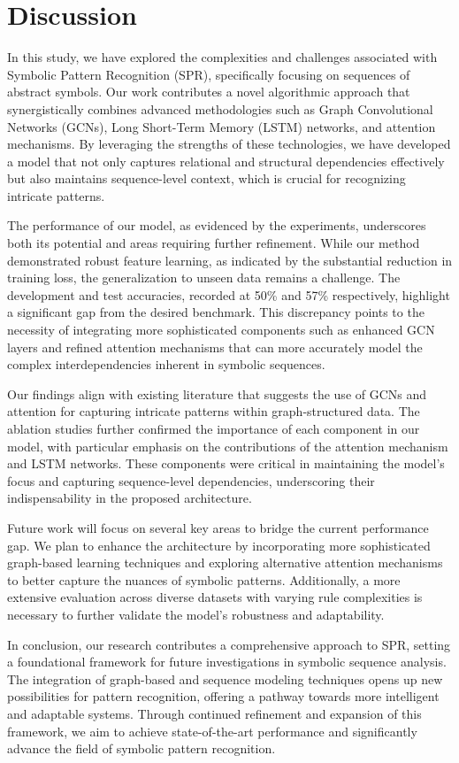 \documentclass{article}
\begin{document}
\section{Discussion}
In this study, we have explored the complexities and challenges associated with Symbolic Pattern Recognition (SPR), specifically focusing on sequences of abstract symbols. Our work contributes a novel algorithmic approach that synergistically combines advanced methodologies such as Graph Convolutional Networks (GCNs), Long Short-Term Memory (LSTM) networks, and attention mechanisms. By leveraging the strengths of these technologies, we have developed a model that not only captures relational and structural dependencies effectively but also maintains sequence-level context, which is crucial for recognizing intricate patterns.

The performance of our model, as evidenced by the experiments, underscores both its potential and areas requiring further refinement. While our method demonstrated robust feature learning, as indicated by the substantial reduction in training loss, the generalization to unseen data remains a challenge. The development and test accuracies, recorded at 50\% and 57\% respectively, highlight a significant gap from the desired benchmark. This discrepancy points to the necessity of integrating more sophisticated components such as enhanced GCN layers and refined attention mechanisms that can more accurately model the complex interdependencies inherent in symbolic sequences.

Our findings align with existing literature that suggests the use of GCNs and attention for capturing intricate patterns within graph-structured data. The ablation studies further confirmed the importance of each component in our model, with particular emphasis on the contributions of the attention mechanism and LSTM networks. These components were critical in maintaining the model's focus and capturing sequence-level dependencies, underscoring their indispensability in the proposed architecture.

Future work will focus on several key areas to bridge the current performance gap. We plan to enhance the architecture by incorporating more sophisticated graph-based learning techniques and exploring alternative attention mechanisms to better capture the nuances of symbolic patterns. Additionally, a more extensive evaluation across diverse datasets with varying rule complexities is necessary to further validate the model's robustness and adaptability.

In conclusion, our research contributes a comprehensive approach to SPR, setting a foundational framework for future investigations in symbolic sequence analysis. The integration of graph-based and sequence modeling techniques opens up new possibilities for pattern recognition, offering a pathway towards more intelligent and adaptable systems. Through continued refinement and expansion of this framework, we aim to achieve state-of-the-art performance and significantly advance the field of symbolic pattern recognition.
\end{document}
